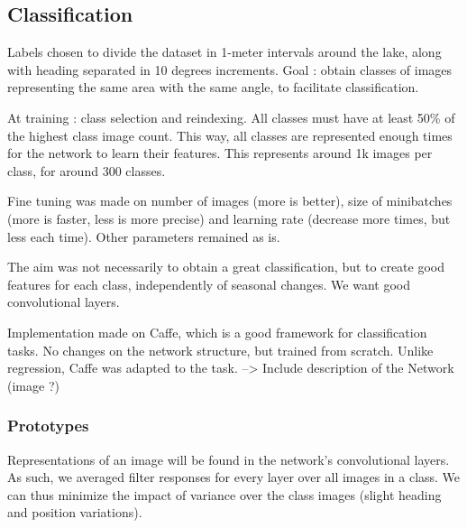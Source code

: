 \subsection{Classification}
Labels chosen to divide the dataset in 1-meter intervals around the lake, along with heading separated in 10 degrees increments. Goal : obtain classes of images representing the same area with the same angle, to facilitate classification.

At training : class selection and reindexing. All classes must have at least 50\% of the highest class image count. This way, all classes are represented enough times for the network to learn their features. This represents around 1k images per class, for around 300 classes.

Fine tuning was made on number of images (more is better), size of minibatches (more is faster, less is more precise) and learning rate (decrease more times, but less each time). Other parameters remained as is.

The aim was not necessarily to obtain a great classification, but to create good features for each class, independently of seasonal changes. We want good convolutional layers.

Implementation made on Caffe, which is a good framework for classification tasks. No changes on the network structure, but trained from scratch. Unlike regression, Caffe was adapted to the task.
--> Include description of the Network (image ?)

\subsubsection{Prototypes}
Representations of an image will be found in the network's convolutional layers. As such, we averaged filter responses for every layer over all images in a class. We can thus minimize the impact of variance over the class images (slight heading and position variations).